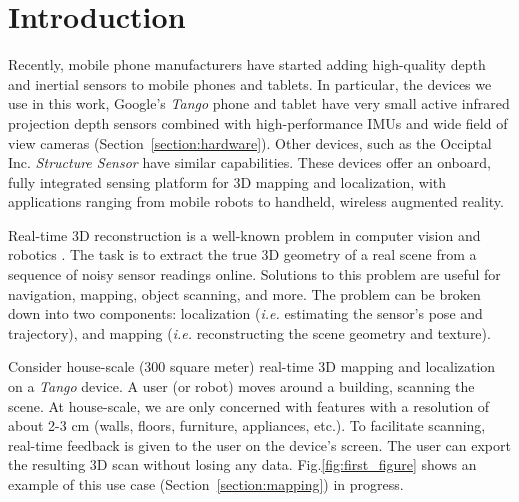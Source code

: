 \documentclass[conference]{IEEEtran}
\newcommand{\sref}[1]{Section~\ref{#1}}
\newcommand{\figref}[1]{Fig.\ref{#1}}
\newcommand{\ie}{\textit{i.e.}\xspace}
\newcommand{\Tango}{\textit{Tango}\xspace}
\begin{document}
\section{Introduction}
Recently, mobile phone manufacturers have started adding
high-quality depth and  inertial sensors to mobile phones and tablets. In
particular, the devices we use in this work, Google's \Tango \cite{Tango}
phone and tablet have very small active infrared projection depth sensors
combined with high-performance IMUs and wide field of view cameras
(\sref{section:hardware}). Other devices, such as the Occiptal Inc.
\textit{Structure Sensor} \cite{StructureSensor} have similar capabilities.
These devices offer an onboard, fully integrated sensing platform for 3D mapping
and localization, with applications ranging from mobile robots to handheld,
wireless augmented reality. 

Real-time 3D reconstruction is a well-known problem in computer vision and
robotics \cite{Hartley2004}. The task is to extract the true 3D geometry of a
real scene from a sequence of noisy sensor readings online. Solutions to this
problem are useful for navigation, mapping, object scanning, and more. The
problem can be broken down into two components: localization (\ie estimating
the sensor's pose and trajectory), and mapping (\ie reconstructing the scene
geometry and texture).

Consider house-scale (300 square meter) real-time 3D mapping and localization on
a \Tango device.  A user (or robot) moves around a building, scanning
the scene. At house-scale, we are only concerned with features with a resolution
of about 2-3 cm (walls, floors, furniture, appliances, etc.). To facilitate
scanning, real-time feedback is given to the user on the device's screen.  The
user can export the resulting 3D scan without losing any data.
\figref{fig:first_figure} shows an example of this use case (\sref{section:mapping})
in progress. 

\end{document}
